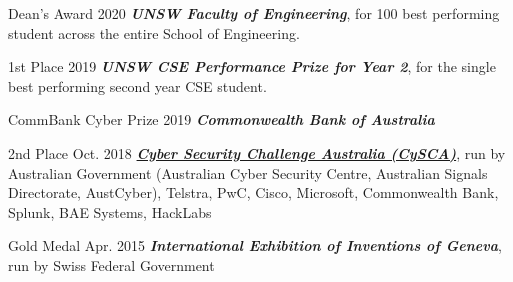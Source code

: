 \documentclass[hidelinks__VERSION__]{adamyi-cv}
\begin{document}
\begin{entrylist}


\entry
{Dean's Award}
{2020}
{\emph{\textbf{UNSW Faculty of Engineering}}, for 100 best performing student across the entire School of Engineering.}


\entry
{1st Place}
{2019}
{\emph{\textbf{UNSW CSE Performance Prize for Year 2}}, for the single best performing second year CSE student.}


\entry
{CommBank Cyber Prize}
{2019}
{\emph{\textbf{Commonwealth Bank of Australia}}}


\entry
{2nd Place}
{Oct. 2018}
{\emph{\textbf{\href{https://www.cyberchallenge.com.au/}{Cyber Security Challenge Australia (CySCA)}}}, run by Australian Government (Australian Cyber Security Centre, Australian Signals Directorate, AustCyber), Telstra, PwC, Cisco, Microsoft, Commonwealth Bank, Splunk, BAE Systems, HackLabs}




\entry
{Gold Medal}
{Apr. 2015}
{\emph{\textbf{International Exhibition of Inventions of Geneva}}, run by Swiss Federal Government}


\end{entrylist}

\end{document}
